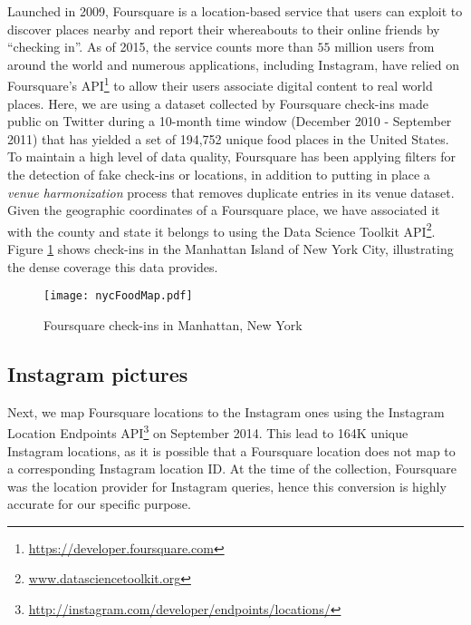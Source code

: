 \documentclass{sig-alternate-2013}
\begin{document}
\begin{figure*}[t!]
\hfill
{}\hfill
{}
\caption{Populations, pictures posted, and unique users per US county in the Instagram dataset, ordered by population (shown in (a)) in all three graphs
\label{figure:datasetstats}}
\end{figure*}

Launched in 2009, Foursquare is a location-based service that users can exploit to discover places nearby and report their whereabouts to their online friends by ``checking in''. As of 2015, the service counts more than $55$ million users from around the world and numerous applications, including Instagram, have relied on Foursquare's API\footnote{\url{https://developer.foursquare.com}} to allow their users associate digital content to real world places. Here, we are using a dataset collected by Foursquare check-ins made public on Twitter during a 10-month time window (December 2010 - September 2011) that has yielded a set of 194,752 unique food places in the United States. To maintain a high level of data quality, Foursquare has been applying filters for the detection of fake check-ins or locations, in addition to putting in place a \textit{venue harmonization} process that removes duplicate entries in its venue dataset. Given the geographic coordinates of a Foursquare place, we have associated it with the county and state it belongs to using the Data Science Toolkit API\footnote{\url{www.datasciencetoolkit.org}}. Figure \ref{figure:4sq_nyc} shows check-ins in the Manhattan Island of New York City, illustrating the dense coverage this data provides.


\begin{figure}[t]
\centering
\texttt{[image: nycFoodMap.pdf]}
\caption{Foursquare check-ins in Manhattan, New York}
\label{figure:4sq_nyc}
\end{figure}


\subsection{Instagram pictures}

Next, we map Foursquare locations to the Instagram ones using the Instagram Location Endpoints API\footnote{\url{http://instagram.com/developer/endpoints/locations/}} on September 2014. This lead to 164K unique Instagram locations, as it is possible that a Foursquare location does not map to a corresponding Instagram location ID. At the time of the collection, Foursquare was the location provider for Instagram queries, hence this conversion is highly accurate for our specific purpose. 
\end{document}
